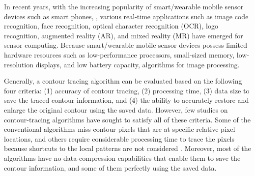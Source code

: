 
In recent years, with the increasing popularity of smart/wearable mobile sensor devices \cite{Aroca2013Wearable} such as smart phones, , various real-time applications such as image code recognition, face recognition, optical character recognition (OCR), logo recognition, augmented reality (AR), and mixed reality (MR) have emerged for sensor computing\cite{Wakaumi20062D,Brodic2010Basic,Kim2006Rapid,Tian2010RealTime,Zhang2012Robust}. Because smart/wearable mobile sensor devices possess limited hardware resources such as low-performance processors, small-sized memory, low-resolution displays, and low battery capacity,  algorithms for image processing. 


Generally, a contour tracing algorithm can be evaluated based on the following four criteria: (1) accuracy of contour tracing, (2) processing time, (3) data size to save the traced contour information, and (4) the ability to accurately restore and enlarge the original contour using the saved data. However, few studies on contour-tracing algorithms have sought to satisfy all of these criteria. Some of the conventional algorithms miss contour pixels that are at specific relative pixel locations, and others require considerable processing time to trace the pixels because shortcuts to the local patterns are not considered \cite{Cheong2006Improved,Cheong2012Advanced}. Moreover, most of the algorithms have no data-compression capabilities that enable them to save the contour information, and some of them  perfectly using the saved data\cite{Miyatake1997Contour}. 

